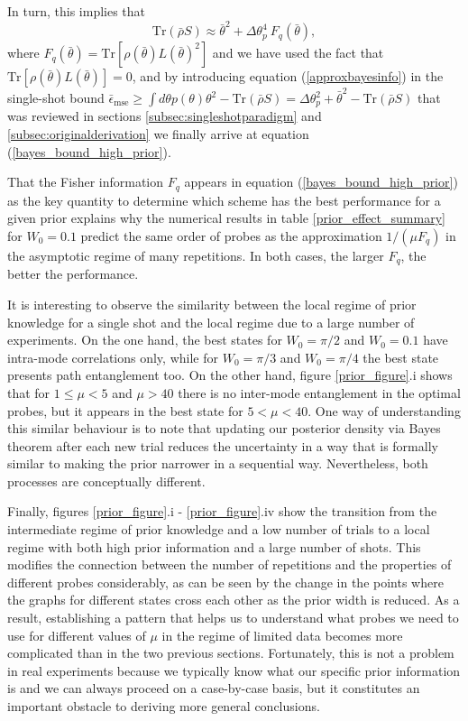 In turn, this implies that 
\begin{equation}
\mathrm{Tr}\left(\bar{\rho}S\right) \approx \bar{\theta}^2 + \Delta \theta^4_p~F_q(\bar{\theta}),
\label{approxbayesinfo}
\end{equation}
where $F_q(\bar{\theta}) = \mathrm{Tr}[\rho(\bar{\theta})L(\bar{\theta})^2]$ and we have used the fact that $\mathrm{Tr}[\rho(\bar{\theta})L(\bar{\theta})] = 0$, and by introducing equation (\ref{approxbayesinfo}) in the single-shot bound $\bar{\epsilon}_{\mathrm{mse}} \geqslant \int d\theta p(\theta)\theta^2 - \mathrm{Tr}(\bar{\rho}S) = \Delta\theta^2_p + \bar{\theta}^2 - \mathrm{Tr}(\bar{\rho}S)$ that was reviewed in sections \ref{subsec:singleshotparadigm} and \ref{subsec:originalderivation} we finally arrive at equation (\ref{bayes_bound_high_prior}).

That the Fisher information $F_q$ appears in equation (\ref{bayes_bound_high_prior}) as the key quantity to determine which scheme has the best performance for a given prior explains why the numerical results in table \ref{prior_effect_summary} for $W_0=0.1$ predict the same order of probes as the approximation $1/(\mu F_q)$ in the asymptotic regime of many repetitions. In both cases, the larger $F_q$, the better the performance. 

It is interesting to observe the similarity between the local regime of prior knowledge for a single shot and the local regime due to a large number of experiments. On the one hand, the best states for $W_0=\pi/2$ and $W_0=0.1$ have intra-mode correlations only, while for $W_0 = \pi/3$ and $W_0 = \pi/4$ the best state presents path entanglement too. On the other hand, figure \ref{prior_figure}.i shows that for $1\leqslant\mu<5$ and $\mu>40$ there is no inter-mode entanglement in the optimal probes, but it appears in the best state for $5<\mu<40$. One way of understanding this similar behaviour is to note that updating our posterior density via Bayes theorem after each new trial reduces the uncertainty in a way that is formally similar to making the prior narrower in a sequential way. Nevertheless, both processes are conceptually different. 

Finally, figures \ref{prior_figure}.i - \ref{prior_figure}.iv show the transition from the intermediate regime of prior knowledge and a low number of trials to a local regime with both high prior information and a large number of shots. This modifies the connection between the number of repetitions and the properties of different probes considerably, as can be seen by the change in the points where the graphs for different states cross each other as the prior width is reduced. As a result, establishing a pattern that helps us to understand what probes we need to use for different values of $\mu$ in the regime of limited data becomes more complicated than in the two previous sections. Fortunately, this is not a problem in real experiments because we typically know what our specific prior information is and we can always proceed on a case-by-case basis, but it constitutes an important obstacle to deriving more general conclusions.

